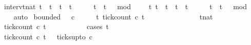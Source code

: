 \begin{isabellebody}
\isanewline
{}\isamarkupfalse%
\ interv{\isacharunderscore}{}{\isacharcolon}{\isacartoucheopen}{\isacharbraceleft}t{\isacharcolon}{\isacharcolon}nat{\isachardot}\ t\ {\isasymle}\ t\ {\isasymand}\ t\ {\isacharless}\ t\ {\isacharplus}\ {}\ {\isasymand}\ {}\ {\isasymle}\ t\ {\isasymand}\ {\isacharparenleft}t\ {\isacharminus}\ {}{\isacharparenright}\ mod\ {}\ {\isacharequal}\ {}{\isacharbraceright}\ {\isacharequal}\ {\isacharbraceleft}t{\isachardot}\ {\isacharparenleft}t\ {\isacharequal}\ t\ {\isasymor}\ t\ {\isacharequal}\ t\ {\isacharplus}\ {}{\isacharparenright}\ {\isasymand}\ {}\ {\isasymle}\ t\ {\isasymand}\ {\isacharparenleft}t\ {\isacharminus}\ {}{\isacharparenright}\ mod\ {}\ {\isacharequal}\ {}{\isacharbraceright}{\isacartoucheclose}\isanewline
%
\isadelimproof
\ \ %
\endisadelimproof
%
\isatagproof
{}\isamarkupfalse%
\ auto%
\endisatagproof
{\isafoldproof}%
%
\isadelimproof
\isanewline
%
\endisadelimproof
\isanewline
{}\isamarkupfalse%
\ {\isacartoucheopen}bounded\ {}\ {}\ c{}{\isacartoucheclose}\isanewline
%
\isadelimproof
%
\endisadelimproof
%
\isatagproof
{}\isamarkupfalse%
\ {\isacharminus}\isanewline
\ \ \isamarkupfalse%
\ {\isacartoucheopen}{\isasymforall}t{\isachardot}\ tick{\isacharunderscore}count\ c{}\ t\ {}\ {\isasymle}\ {}{\isacartoucheclose}\isanewline
\ \ \isamarkupfalse%
\ {\isacharminus}\isanewline
\ \ \ \ \isacommand{{\isacharbraceleft}}\isamarkupfalse%
\ \isamarkupfalse%
\ tnat\isanewline
\ \ \ \ \ \ \isamarkupfalse%
\ {\isacartoucheopen}tick{\isacharunderscore}count\ c{}\ t\ {}\ {\isasymle}\ {}{\isacartoucheclose}\isanewline
\ \ \ \ \ \ \isamarkupfalse%
\ {\isacharparenleft}cases\ t\isanewline
\ \ \ \ \ \ \ \ \isamarkupfalse%
\ {}\isanewline
\ \ \ \ \ \ \ \ \ \ \isamarkupfalse%
\ {\isacartoucheopen}tick{\isacharunderscore}count\ c{}\ t\ {}\ {\isacharequal}\ ticks{\isacharunderscore}up{\isacharunderscore}to\ c{}\ {}{\isacartoucheclose}\isanewline

\end{isabellebody}

